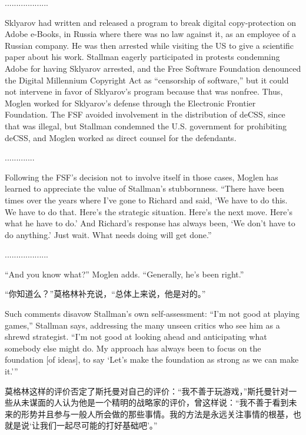 \ifdefined\chs
...................
\fi

\ifdefined\eng
Sklyarov had written and released a program to break digital copy-protection on Adobe e-Books, in Russia where there was no law against it, as an employee of a Russian company.  He was then arrested while visiting the US to give a scientific paper about his work. Stallman eagerly participated in protests condemning Adobe for having Sklyarov arrested, and the Free Software Foundation denounced the Digital Millennium Copyright Act as ``censorship of software,'' but it could not intervene in favor of Sklyarov's program because that was nonfree.  Thus, Moglen worked for Sklyarov's defense through the Electronic Frontier Foundation.  The FSF avoided involvement in the distribution of deCSS, since that was illegal, but Stallman condemned the U.S. government for prohibiting deCSS, and Moglen worked as direct counsel for the defendants.
\fi

\ifdefined\chs
.............
\fi

\ifdefined\eng
Following the FSF's decision not to involve itself in those cases, Moglen has learned to appreciate the value of Stallman's stubbornness. ``There have been times over the years where I've gone to Richard and said, `We have to do this. We have to do that. Here's the strategic situation. Here's the next move. Here's what he have to do.' And Richard's response has always been, `We don't have to do anything.' Just wait. What needs doing will get done.''
\fi

\ifdefined\chs
...................
\fi

\ifdefined\eng
``And you know what?'' Moglen adds. ``Generally, he's been right.''
\fi

\ifdefined\chs
“你知道么？”莫格林补充说，“总体上来说，他是对的。”
\fi

\ifdefined\eng
Such comments disavow Stallman's own self-assessment: ``I'm not good at playing games,'' Stallman says, addressing the many unseen critics who see him as a shrewd strategist. ``I'm not good at looking ahead and anticipating what somebody else might do. My approach has always been to focus on the foundation [of ideas], to say `Let's make the foundation as strong as we can make it.'\hspace{0.01in}''
\fi

\ifdefined\chs
莫格林这样的评价否定了斯托曼对自己的评价：“我不善于玩游戏，”斯托曼针对一些从未谋面的人认为他是一个精明的战略家的评价，曾这样说：“我不善于看到未来的形势并且参与一般人所会做的那些事情。我的方法是永远关注事情的根基，也就是说‘让我们一起尽可能的打好基础吧’。”
\fi

